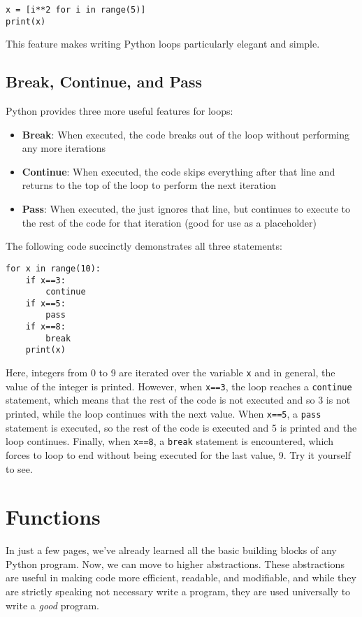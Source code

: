 \documentclass[12pt]{article}
\newcommand{\code}{\texttt}
\begin{document}
\begin{lstlisting}[frame=single] 
x = [i**2 for i in range(5)]
print(x)
\end{lstlisting}

This feature makes writing Python loops particularly elegant and simple.

\subsection{Break, Continue, and Pass}
Python provides three more useful features for loops:

\begin{itemize}
	\item \textbf{Break}: When executed, the code breaks out of the loop without performing any more iterations
	\item \textbf{Continue}: When executed, the code skips everything after that line and returns to the top of the loop to perform the next iteration
	\item \textbf{Pass}: When executed, the just ignores that line, but continues to execute to the rest of the code for that iteration (good for use as a placeholder)
\end{itemize}

The following code succinctly demonstrates all three statements:

\begin{lstlisting}[frame=single] 
for x in range(10):
    if x==3:
        continue
    if x==5:
        pass
    if x==8:
        break
    print(x)
\end{lstlisting}

Here, integers from 0 to 9 are iterated over the variable \code{x} and in general, the value of the integer is printed. However, when \code{x==3}, the loop reaches a \code{continue} statement, which means that the rest of the code is not executed and so 3 is not printed, while the loop continues with the next value. When \code{x==5}, a \code{pass} statement is executed, so the rest of the code is executed and 5 is printed and the loop continues. Finally, when \code{x==8}, a \code{break} statement is encountered, which forces to loop to end without being executed for the last value, 9. Try it yourself to see.

\newpage
\section{Functions}
In just a few pages, we've already learned all the basic building blocks of any Python program. Now, we can move to higher abstractions. These abstractions are useful in making code more efficient, readable, and modifiable, and while they are strictly speaking not necessary write a program, they are used universally to write a \textit{good} program.
\end{document}
